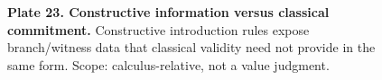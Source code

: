 \begin{figure}[p]\centering{}\caption{\textbf{Plate 23. Constructive information versus classical commitment.} Constructive introduction rules expose branch/witness data that classical validity need not provide in the same form. Scope: calculus-relative, not a value judgment.}\label{plate:constructive-classical}\end{figure}
